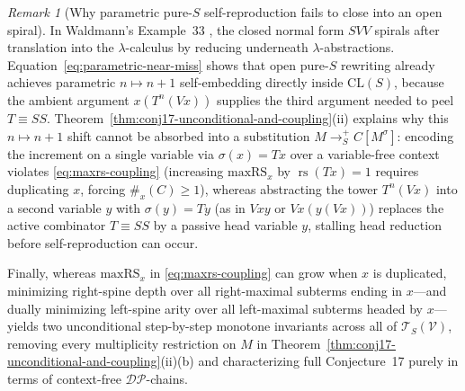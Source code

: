 \documentclass[11pt,reqno]{amsart}
\numberwithin{equation}{section}
\theoremstyle{plain}
\theoremstyle{definition}
\theoremstyle{remark}
\newtheorem{remark}[theorem]{Remark}
\DeclareMathOperator{\rs}{rs}
\newcommand{\CLS}{\mathrm{CL}(S)}
\newcommand{\TSV}{\mathcal{T}_S(\mathcal{V})}
\newcommand{\redSp}{\to_S^+}
\begin{document}
\begin{remark}[Why parametric pure-$S$ self-reproduction fails to close into an open spiral]\label{rem:conj17-near-miss-barrier}
In Waldmann's Example~33 \cite[p.~95]{BarendregtEndrullisKlopWaldmann2017}, the closed normal form $S V V$ spirals after translation into the $\lambda$-calculus by reducing underneath $\lambda$-abstractions. Equation~\eqref{eq:parametric-near-miss} shows that open pure-$S$ rewriting already achieves parametric $n \mapsto n + 1$ self-embedding directly inside $\CLS$, because the ambient argument $x(T^n(V x))$ supplies the third argument needed to peel $T \equiv S S$. Theorem~\ref{thm:conj17-unconditional-and-coupling}(ii) explains why this $n \mapsto n + 1$ shift cannot be absorbed into a substitution $M \redSp C[M^\sigma]$: encoding the increment on a single variable via $\sigma(x) = T x$ over a variable-free context violates \eqref{eq:maxrs-coupling} (increasing $\mathrm{maxRS}_x$ by $\rs(T x) = 1$ requires duplicating $x$, forcing $\#_x(C) \ge 1$), whereas abstracting the tower $T^n(V x)$ into a second variable $y$ with $\sigma(y) = T y$ (as in $V x y$ or $V x (y(V x))$) replaces the active combinator $T \equiv S S$ by a passive head variable $y$, stalling head reduction before self-reproduction can occur.
\end{remark}


Finally, whereas $\mathrm{maxRS}_x$ in \eqref{eq:maxrs-coupling} can grow when $x$ is duplicated, minimizing right-spine depth over all right-maximal subterms ending in $x$---and dually minimizing left-spine arity over all left-maximal subterms headed by $x$---yields two unconditional step-by-step monotone invariants across all of $\TSV$, removing every multiplicity restriction on $M$ in Theorem~\ref{thm:conj17-unconditional-and-coupling}(ii)(b) and characterizing full Conjecture~17 purely in terms of context-free $\mathcal{DP}$-chains.
\end{document}
